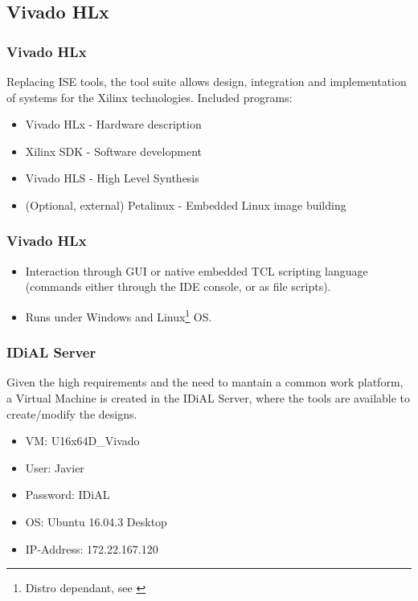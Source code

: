 
\subsection{Vivado HLx}

\begin{frame}
	\frametitle{Vivado HLx}
	Replacing ISE tools, the tool suite allows design, integration and implementation of systems for the Xilinx technologies.
	\vfill \pause
	Included programs:
	\begin{itemize}
		\item Vivado HLx - Hardware description \pause
		\item Xilinx SDK - Software development \pause
		\item Vivado HLS - High Level Synthesis \pause
		\item (Optional, external) Petalinux - Embedded Linux image building
	\end{itemize}
\end{frame}

\begin{frame}
	\frametitle{Vivado HLx}
	\begin{itemize}
		\item Interaction through GUI or native embedded TCL scripting language (commands either through the IDE console, or as file scripts).
		\vspace{2 em} \pause
		\item Runs under Windows and Linux\footnote[frame]{Distro dependant, see \cite{UG973}} OS.
	\end{itemize}
\end{frame}

\begin{frame}
	\frametitle{IDiAL Server}
	Given the high requirements and the need to mantain a common work platform, a Virtual Machine is created in the IDiAL Server, where the tools are available to create/modify the designs.
	\vfill
	\begin{itemize}
		\item VM: U16x64D\_Vivado
		\item User: Javier
		\item Password: IDiAL
		\item OS: Ubuntu 16.04.3 Desktop
		\item IP-Address: 172.22.167.120
	\end{itemize}
\end{frame}

